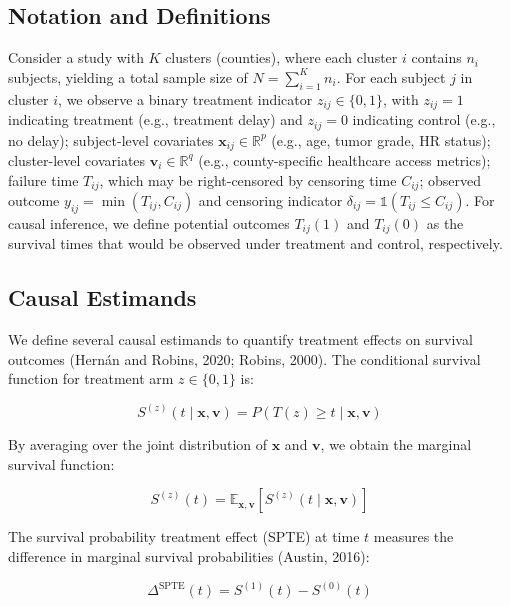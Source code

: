 \documentclass[useAMS,referee]{biom}
\begin{document}
\subsection{Notation and Definitions}

Consider a study with $K$ clusters (counties), where each cluster $i$ contains $n_i$ subjects, yielding a total sample size of $N = \sum_{i=1}^K n_i$. For each subject $j$ in cluster $i$, we observe a binary treatment indicator $z_{ij} \in \{0,1\}$, with $z_{ij}=1$ indicating treatment (e.g., treatment delay) and $z_{ij}=0$ indicating control (e.g., no delay); subject-level covariates $\mathbf{x}_{ij} \in \mathbb{R}^p$ (e.g., age, tumor grade, HR status); cluster-level covariates $\mathbf{v}_i \in \mathbb{R}^q$ (e.g., county-specific healthcare access metrics); failure time $T_{ij}$, which may be right-censored by censoring time $C_{ij}$; observed outcome $y_{ij} = \min(T_{ij}, C_{ij})$ and censoring indicator $\delta_{ij} = \mathds{1}(T_{ij} \leq C_{ij})$. For causal inference, we define potential outcomes $T_{ij}(1)$ and $T_{ij}(0)$ as the survival times that would be observed under treatment and control, respectively.

\subsection{Causal Estimands}

We define several causal estimands to quantify treatment effects on survival outcomes (Hernán and Robins, 2020; Robins, 2000). The conditional survival function for treatment arm $z \in \{0,1\}$ is:

\begin{equation}
S^{(z)}(t \mid \mathbf{x}, \mathbf{v}) = P(T(z) \geq t \mid \mathbf{x}, \mathbf{v})
\end{equation}

By averaging over the joint distribution of $\mathbf{x}$ and $\mathbf{v}$, we obtain the marginal survival function:

\begin{equation}
S^{(z)}(t) = \mathbb{E}_{\mathbf{x}, \mathbf{v}}[S^{(z)}(t \mid \mathbf{x}, \mathbf{v})]
\end{equation}

The survival probability treatment effect (SPTE) at time $t$ measures the difference in marginal survival probabilities (Austin, 2016):

\begin{equation}
\Delta^{\text{SPTE}}(t) = S^{(1)}(t) - S^{(0)}(t)
\end{equation}
\end{document}
